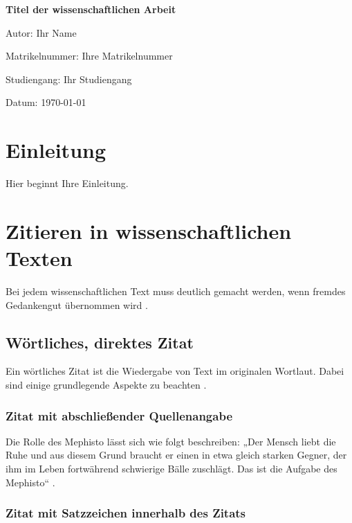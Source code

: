 \documentclass[12pt,a4paper]{article}
\begin{document}
\begin{titlepage}
    \centering
    {\Large\bfseries Titel der wissenschaftlichen Arbeit\par}
    \vspace{2cm}
    {\large Autor: Ihr Name\par}
    {\large Matrikelnummer: Ihre Matrikelnummer\par}
    {\large Studiengang: Ihr Studiengang\par}
    \vfill
    {\large Datum: \today\par}
\end{titlepage}

\tableofcontents
\newpage

\section{Einleitung}

Hier beginnt Ihre Einleitung.

\section{Zitieren in wissenschaftlichen Texten}

Bei jedem wissenschaftlichen Text muss deutlich gemacht werden, wenn fremdes Gedankengut übernommen wird \parencite[vgl.][S. 15]{Mustermann2005}.

\subsection{Wörtliches, direktes Zitat}

Ein wörtliches Zitat ist die Wiedergabe von Text im originalen Wortlaut. Dabei sind einige grundlegende Aspekte zu beachten \parencite[vgl.][S. 102]{Schmidt2004}.

\subsubsection{Zitat mit abschließender Quellenangabe}

Die Rolle des Mephisto lässt sich wie folgt beschreiben: „Der Mensch liebt die Ruhe und aus diesem Grund braucht er einen in etwa gleich starken Gegner, der ihm im Leben fortwährend schwierige Bälle zuschlägt. Das ist die Aufgabe des Mephisto“ \parencite[][S. 102]{Schmidt2004}.

\subsubsection{Zitat mit Satzzeichen innerhalb des Zitats}
\end{document}
